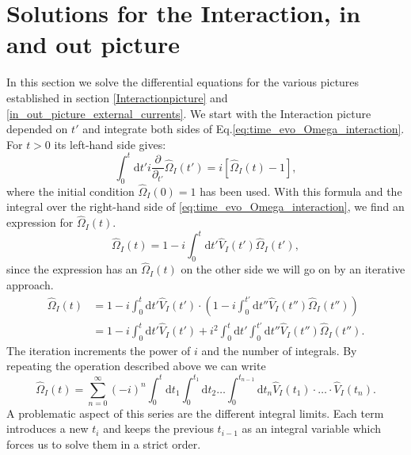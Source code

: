 \documentclass[
11pt, %
english, %
singlespacing, %
headsepline, %
]{MastersDoctoralThesis} %
\begin{document}
\section{Solutions for the Interaction, $ \pmb{in} $  and $ \pmb{out} $ picture}\label{solutions_interaction_in_out}
In this section we solve the differential equations for the various pictures established in section \ref{Interactionpicture} and \ref{in_out_picture_external_currents}.
We start with the Interaction picture depended on $ t' $  and integrate both sides of Eq.\enskip\eqref{eq:time_evo_Omega_interaction}. For $ t>0 $ its left-hand side gives:
\begin{equation}\label{first_term_left_Omega_time_order}
\int_{0}^{t}\mathrm{d}t'
 i 
 \frac{\partial}{\partial_{t'}} 
 \hat{\Omega}_{I} (t')
 =
 i
 \left[ 
\hat{\Omega}_{I}(t) -1
 \right] 
 ,
\end{equation}
where the initial condition $ \hat{\Omega}_{I}(0)=1 $ has been used.
With this formula and the integral over the right-hand side of \eqref{eq:time_evo_Omega_interaction}, we find an expression for $ \hat{\Omega}_{I}(t) $.
\begin{equation}
\hat{\Omega}_{I}(t)=
1
-
i
\int_{0}^{t}\mathrm{d}t'\hat{V}_{I}(t')\hat{\Omega}_{I}(t')	,
\end{equation}
since the expression has an $ \hat{\Omega}_{I}(t) $ on the other side we will go on by an iterative approach.
\begin{equation}\label{Omega_first_terms}
\begin{split}
\hat{\Omega}_{I}(t)
&=
1
-
i 
\int_{0}^{t}\mathrm{d}t'\hat{V}_{I}(t')
\cdot
\left( 
1
-
i
\int_{0}^{t'}\mathrm{d}t''\hat{V}_{I}(t'')\hat{\Omega}_{I}(t'')
\right) 
\\
&=
1
-
i
\int_{0}^{t}\mathrm{d}t'\hat{V}_{I}(t')
+i^{2} 
\int_{0}^{t}\mathrm{d}t'
\int_{0}^{t'}\mathrm{d}t''
\hat{V}_{I}(t'')\hat{\Omega}_{I}(t'')
.
\end{split}
\end{equation}
The iteration increments the power of $ i $ and the number of integrals. By repeating the operation described above we can write
\begin{equation}\label{Omega_different_t}
\hat{\Omega}_{I}(t) =
\sum\limits_{n=0}^{\infty} 
(-i)^{n}
\int_{0}^{t}\mathrm{d}t_1\int_{0}^{t_{1}}\! \! \mathrm{d}t_2
 \ldots
 \int_{0}^{t_{n-1}}\! \! \mathrm{d}t_n
  \hat{V}_{I}(t_1)\cdot \ldots \cdot \hat{V}_{I}(t_n)
  .
\end{equation}
A problematic aspect of this series are the different integral limits. Each term introduces a new $ t_{i} $ and keeps the previous $ t_{i-1} $ as an integral variable which forces us to solve them in a strict order. 
\end{document}

